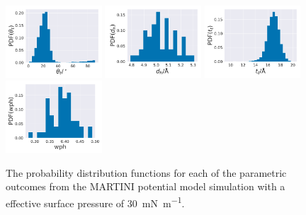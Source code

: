 \documentclass[amsmath,amssymb,superscriptaddress]{revtex4-1}
\begin{document}
%
%
\begin{figure}
 \centering
 \includegraphics[width=0.32\textwidth]{martini_30_angle}
 \includegraphics[width=0.32\textwidth]{martini_30_dh}
 \includegraphics[width=0.32\textwidth]{martini_30_tt}
 \includegraphics[width=0.32\textwidth]{martini_30_wph}
 \caption{The probability distribution functions for each of the parametric outcomes from the MARTINI potential model simulation with a effective surface pressure of \SI{30}{\milli\newton\per\meter}.}
 \label{fig:ma30}
\end{figure}
%
%
\end{document}
